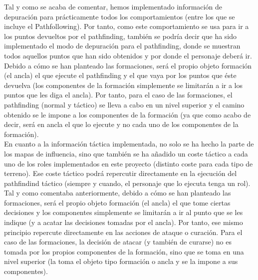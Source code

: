 Tal y como se acaba de comentar, hemos implementado información de depuración para prácticamente todos los comportamientos (entre los que se incluye el Pathfollowing). Por tanto, como este comportamiento se usa para ir a los puntos devueltos por el pathfinding, también se podría decir que ha sido implementado el modo de depuración para el pathfinding, donde se muestran todos aquellos puntos que han sido obtenidos y por donde el personaje deberá ir. \\

Debido a cómo se han planteado las formaciones, será el propio objeto formación (el ancla) el que ejecute el pathfinding y el que vaya por los puntos que éste devuelva (los componentes de la formación simplemente se limitarán a ir a los puntos que les diga el ancla). Por tanto, para el caso de las formaciones, el pathfinding (normal y táctico) se lleva a cabo en un nivel superior y el camino obtenido se le impone a los componentes de la formación (ya que como acabo de decir, será en ancla el que lo ejecute y no cada uno de los componentes de la formación). \\

En cuanto a la información táctica implementada, no solo se ha hecho la parte de los mapas de influencia, sino que también se ha añadido un coste táctico a cada uno de los roles implementados en este proyecto (distinto coste para cada tipo de terreno). Ese coste táctico podrá repercutir directamente en la ejecución del pathfindind táctico (siempre y cuando, el personaje que lo ejecuta tenga un rol). \\

Tal y como comentaba anteriormente, debido a cómo se han planteado las formaciones, será el propio objeto formación (el ancla) el que tome ciertas decisiones y los componentes simplemente se limitarán a ir al punto que se les indique (y a acatar las decisiones tomadas por el ancla). Por tanto, ese mismo principio repercute directamente en las acciones de ataque o curación. Para el caso de las formaciones, la decisión de atacar (y también de curarse) no es tomada por los propios componentes de la formación, sino que se toma en una nivel superior (la toma el objeto tipo formación o ancla y se la impone a sus componentes).



